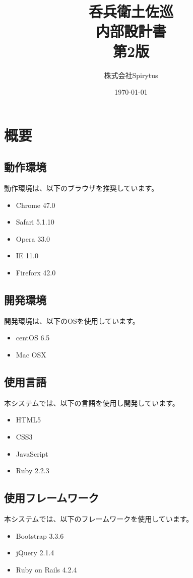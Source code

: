 \documentclass[a4j,titlepage]{jarticle}
\title{呑兵衛土佐巡\\
内部設計書\\
第2版}
\author{株式会社Spirytus}
\date{\today}
\begin{document}
\maketitle
\tableofcontents

\clearpage

\section{概要}
\subsection{動作環境}
動作環境は、以下のブラウザを推奨しています。
\begin{itemize}
\item Chrome 47.0
\item Safari 5.1.10
\item Opera 33.0
\item IE 11.0
\item Fireforx 42.0
\end{itemize}

\subsection{開発環境}
開発環境は、以下のOSを使用しています。
\begin{itemize}
\item centOS 6.5
\item Mac OSX
\end{itemize}

\subsection{使用言語}
本システムでは、以下の言語を使用し開発しています。
\begin{itemize}
\item HTML5
\item CSS3
\item JavaScript
\item Ruby 2.2.3
\end{itemize}

\subsection{使用フレームワーク}
本システムでは、以下のフレームワークを使用しています。
\begin{itemize}
\item Bootstrap 3.3.6
\item jQuery 2.1.4
\item Ruby on Rails 4.2.4
\end{itemize}
\end{document}
